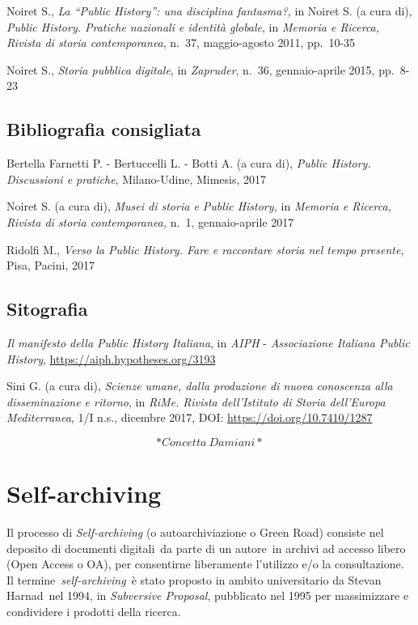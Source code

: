 \documentclass[
  b5paper,
  twoside,
  12pt,
  chapterprefix=false,
  bibliography=totocnumbered,
  parskip=false]{scrbook}
\begin{document}
Noiret S., \emph{La \enquote{Public History}: una disciplina fantasma?,} in Noiret S.
(a cura di), \emph{Public History. Pratiche nazionali e identità globale}, in
\emph{Memoria e Ricerca, Rivista di storia contemporanea}, n.~37,
maggio-agosto 2011, pp.~10-35

Noiret S., \emph{Storia pubblica digitale}, in \emph{Zapruder}, n.~36,
gennaio-aprile 2015, pp.~8-23

\hypertarget{bibliografia-consigliata-21}{%
\section*{Bibliografia consigliata}\label{bibliografia-consigliata-21}}

Bertella Farnetti P. - Bertuccelli L. - Botti A. (a cura di), \emph{Public
History. Discussioni e pratiche}, Milano-Udine, Mimesis, 2017

Noiret S. (a cura di), \emph{Musei di storia e Public History,} in \emph{Memoria e
Ricerca, Rivista di storia contemporanea,} n.~1, gennaio-aprile 2017

Ridolfi M., \emph{Verso la Public History. Fare e raccontare storia nel tempo
presente}, Pisa, Pacini, 2017

\hypertarget{sitografia-27}{%
\section*{Sitografia}\label{sitografia-27}}

\emph{Il manifesto della Public History Italiana}, in \emph{AIPH} - \emph{Associazione
Italiana Public History},
\url{https://aiph.hypotheses.org/3193}

Sini G. (a cura di), \emph{Scienze umane, dalla produzione di nuova
conoscenza alla disseminazione e ritorno}, in \emph{RiMe. Rivista
dell'Istituto di Storia dell'Europa Mediterranea}, 1/I n.s., dicembre
2017, DOI:
\url{https://doi.org/10.7410/1287}

\[*Concetta~Damiani*\]

\hypertarget{self-archiving}{%
\chapter{Self-archiving}\label{self-archiving}}

Il processo di \emph{Self-archiving} (o autoarchiviazione o Green Road)
consiste nel deposito di documenti digitali~da parte di un autore~in
archivi ad accesso libero (Open Access o OA), per consentirne
liberamente l'utilizzo e/o la consultazione. Il
termine~\emph{self-archiving}~è stato proposto in ambito universitario da
Stevan Harnad~nel 1994, in \emph{Subversive Proposal}, pubblicato nel 1995
per massimizzare e condividere i prodotti della ricerca.
\end{document}
